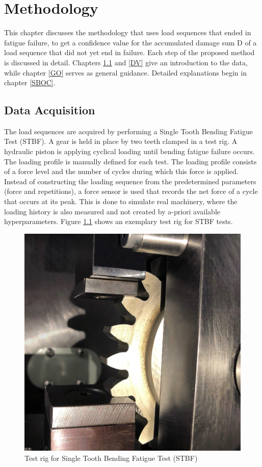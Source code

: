 \chapter{Methodology}\label{MET}
This chapter discusses the methodology that uses load sequences that ended in fatigue failure, to get a confidence value for the accumulated damage sum D of a load sequence that did not yet end in failure. Each step of the proposed method is discussed in detail. Chapters \ref{DA} and \ref{DV} give an introduction to the data, while chapter \ref{GO} serves as general guidance. Detailed explanations begin in chapter \ref{SBOC}.

\section{Data Acquisition}\label{DA}
The load sequences are acquired by performing a Single Tooth Bending Fatigue Test (STBF). A gear is held in place by two teeth clamped in a test rig. A hydraulic piston is applying cyclical loading until bending fatigue failure occurs. The loading profile is manually defined for each test. The loading profile consists of a force level and the number of cycles during which this force is applied. Instead of constructing the loading sequence from the predetermined parameters (force and repetitions), a force sensor is used that records the net force of a cycle that occurs at its peak. This is done to simulate real machinery, where the loading history is also measured and not created by a-priori available hyperparameters. 
Figure \ref{fig:STBFT} shows an exemplary test rig for STBF tests.
\begin{figure}[H]
	\centering
	\includegraphics[width=0.5\linewidth]{IMGs/tooth.jpg}
	\caption{Test rig for Single Tooth Bending Fatigue Test (STBF) \cite{STBT}}
	\label{fig:STBFT}
\end{figure}
\newpage

